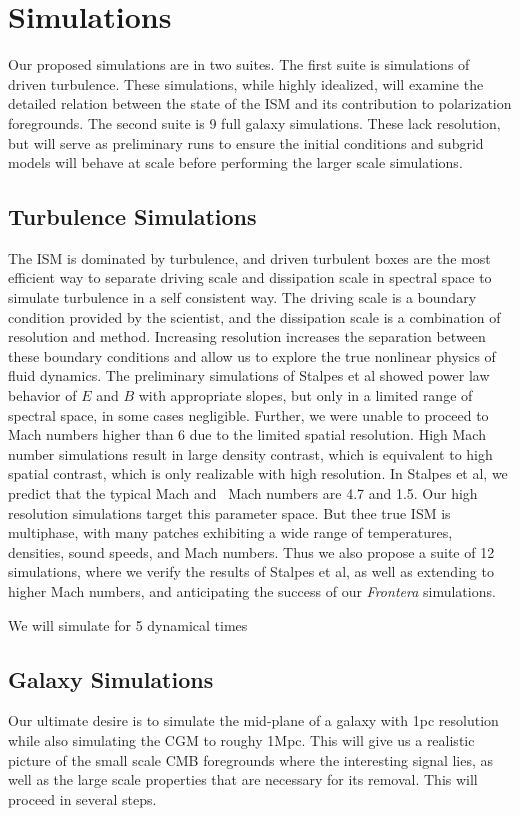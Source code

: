 \section{Simulations}
\label{sec.simulations}

Our proposed simulations are in two suites.  The first suite is 
simulations of driven turbulence.  These simulations, while highly idealized,
will examine the detailed relation between the state of the ISM and its
contribution to polarization foregrounds.  The second suite is 9 full galaxy
simulations.  These lack resolution, but will serve as preliminary runs to
ensure the initial conditions and subgrid models will behave at scale before
performing the larger scale simulations.  

\subsection{Turbulence Simulations}

The ISM is dominated by turbulence, and driven turbulent boxes are the most
efficient way to separate driving scale and dissipation scale in spectral space
to simulate turbulence in a self consistent way.  
The driving scale is a boundary condition provided
by the scientist, and the dissipation scale is a combination of
resolution and method.  Increasing resolution increases the separation between
these boundary conditions and allow us to explore the true nonlinear physics of
fluid dynamics.  The preliminary simulations of Stalpes et al showed
power law behavior of $E$ and $B$ with appropriate slopes, but only in a limited range of spectral
space, in some cases negligible.  Further, we were unable to proceed to Mach
numbers higher than 6 due to the limited spatial resolution.  
High Mach number simulations result in large density contrast, which is
equivalent to high spatial contrast, which is only realizable with high
resolution.  In Stalpes et al, we predict that the typical Mach and \alf\ Mach
numbers are 4.7 and 1.5.  Our high resolution simulations target this parameter
space.  But thee true ISM is multiphase, with many patches exhibiting a wide
range of temperatures, densities, sound speeds, and Mach numbers.  Thus we also
propose a suite of 12 simulations, where we verify the results of Stalpes et al,
as well as extending to higher Mach numbers, and anticipating the success of our
\emph{Frontera} simulations.  

We will simulate for 5 dynamical times 

\subsection{Galaxy Simulations}

Our ultimate desire is to simulate the mid-plane of a galaxy with 1pc resolution
while also simulating the CGM to roughy 1Mpc. This will give us a realistic
picture of the small scale CMB foregrounds where the interesting signal lies, as well as the large scale
properties that are necessary for its removal.  This will proceed in several
steps.  


